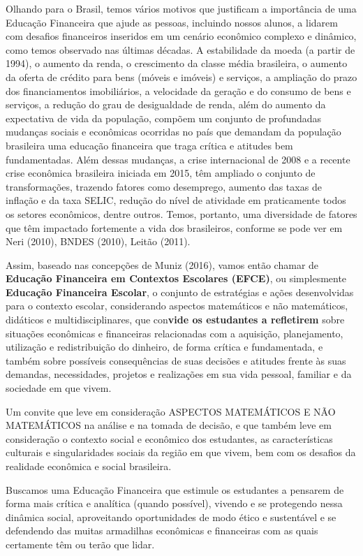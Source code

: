 \begin{apresentacao}
Olhando para o Brasil, temos vários motivos que justificam a importância de uma Educação Financeira que ajude as pessoas, incluindo nossos alunos, a lidarem com desafios financeiros inseridos em um cenário econômico complexo e dinâmico, como temos observado nas últimas décadas. A estabilidade da moeda (a partir de 1994), o aumento da renda, o crescimento da classe média brasileira, o aumento da oferta de crédito para bens (móveis e imóveis) e serviços, a ampliação do prazo dos financiamentos imobiliários, a velocidade da geração e do consumo de bens e serviços, a redução do grau de desigualdade de renda, além do aumento da expectativa de vida da população, compõem um conjunto de profundadas mudanças sociais e econômicas ocorridas no país que demandam da população brasileira uma educação financeira que traga crítica e atitudes bem fundamentadas. Além dessas mudanças, a crise internacional de 2008 e a recente crise econômica brasileira iniciada em 2015, têm ampliado o conjunto de transformações, trazendo fatores como desemprego, aumento das taxas de inflação e da taxa SELIC, redução do nível de atividade em praticamente todos os setores econômicos, dentre outros. Temos, portanto, uma diversidade de fatores que têm impactado fortemente a vida dos brasileiros, conforme se pode ver em Neri (2010), BNDES (2010), Leitão (2011).

Assim, baseado nas concepções de Muniz (2016), vamos então chamar de  \textbf{Educação Financeira em Contextos Escolares (EFCE)}, ou simplesmente \textbf{Educação Financeira Escolar}, o conjunto de estratégias e ações desenvolvidas para o contexto escolar, considerando aspectos matemáticos e não matemáticos, didáticos e multidisciplinares, que con\textbf{vide os estudantes a refletirem} sobre situações econômicas e financeiras relacionadas com a aquisição, planejamento, utilização e redistribuição do dinheiro, de forma crítica e fundamentada, e também sobre possíveis consequências de suas decisões e atitudes frente às suas demandas, necessidades, projetos e realizações em sua vida pessoal, familiar e da sociedade em que vivem.

Um convite que leve em consideração ASPECTOS MATEMÁTICOS E NÃO MATEMÁTICOS na análise e na tomada de decisão, e que também leve em consideração o contexto social e econômico dos estudantes, as características culturais e singularidades sociais da região em que vivem, bem com os desafios da realidade econômica e social brasileira.

Buscamos uma Educação Financeira que estimule os estudantes a pensarem de forma mais crítica e analítica (quando possível), vivendo e se protegendo nessa dinâmica social, aproveitando oportunidades de modo ético e sustentável e se defendendo das muitas armadilhas econômicas e financeiras com as quais certamente têm ou terão que lidar. 


\end{apresentacao}

